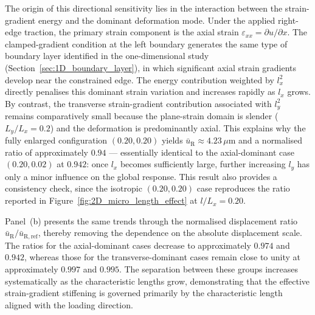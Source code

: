 \documentclass[final,3p,times,fleqn]{elsarticle}
\begin{document}
The origin of this directional sensitivity lies in the interaction
between the strain-gradient energy and the dominant deformation mode.
Under the applied right-edge traction, the primary strain component is
the axial strain $\varepsilon_{xx}=\partial u/\partial x$.
The clamped-gradient condition at the left boundary generates the same
type of boundary layer identified in the one-dimensional study
(Section~\ref{sec:1D_boundary_layer}), in which significant axial
strain gradients develop near the constrained edge.
The energy contribution weighted by $l_{x}^{2}$ directly penalises this
dominant strain variation and increases rapidly as $l_{x}$ grows.
By contrast, the transverse strain-gradient contribution associated
with $l_{y}^{2}$ remains comparatively small because the plane-strain domain is
slender ($L_{y}/L_{x}=0.2$) and the deformation is predominantly
axial.
This explains why the fully enlarged configuration $(0.20,0.20)$
yields $\bar{u}_{\mathrm{R}}\approx 4.23\,\mu\mathrm{m}$ and a
normalised ratio of approximately $0.94$ --- essentially identical to
the axial-dominant case $(0.20,0.02)$ at $0.942$: once $l_{x}$ becomes
sufficiently large, further increasing $l_{y}$ has only a minor
influence on the global response.
This result also provides a consistency check, since the isotropic
$(0.20,0.20)$ case reproduces the ratio reported in
Figure~\ref{fig:2D_micro_length_effect} at $l/L_{x}=0.20$.

Panel~(b) presents the same trends through the normalised displacement
ratio $\bar{u}_{\mathrm{R}}/\bar{u}_{\mathrm{R,ref}}$, thereby removing
the dependence on the absolute displacement scale.
The ratios for the axial-dominant cases decrease to approximately
$0.974$ and $0.942$, whereas those for the transverse-dominant cases
remain close to unity at approximately $0.997$ and $0.995$.
The separation between these groups increases systematically as the
characteristic lengths grow, demonstrating that the effective
strain-gradient stiffening is governed primarily by the characteristic
length aligned with the loading direction.
\end{document}
